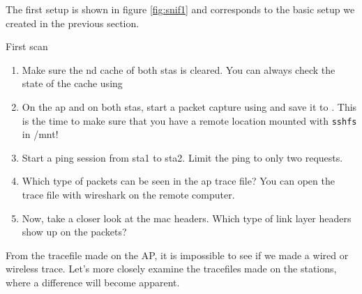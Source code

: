 The first setup is shown in figure \ref{fig:snif1} and corresponds to the basic setup we created in the previous section. 



\begin{exercise}{First scan}\label{ex:firstScan}
\begin{enumerate}
	\item Make sure the \ac{nd} cache of both \acp{sta} is cleared.\label{ex:1-1}\newline
	\remark You can always check the state of the cache using 
	\item On the \ac{ap} and on both \acp{sta}, start a packet capture using  and save it to . \newline
	\remark This is the time to make sure that you have a remote location mounted with \verb!sshfs! in /mnt!\newline\newline
	\item Start a ping session from \ac{sta}1 to \ac{sta}2. Limit the ping to only two requests. \label{ex:1-3}\newline
	\item Which type of packets can be seen in the \acs{ap} trace file? You can open the trace file with wireshark on the remote computer.\newline
	\begin{esolution}
	\end{esolution}
	\item Now, take a closer look at the \ac{mac} headers. Which type of link layer headers show up on the packets?\newline
	\begin{esolution}
	\end{esolution}
\end{enumerate}
\end{exercise}


From the tracefile made on the AP, it is impossible to see if we made a wired or wireless trace. Let's more closely examine the tracefiles made on the stations, where a difference will become apparent.

